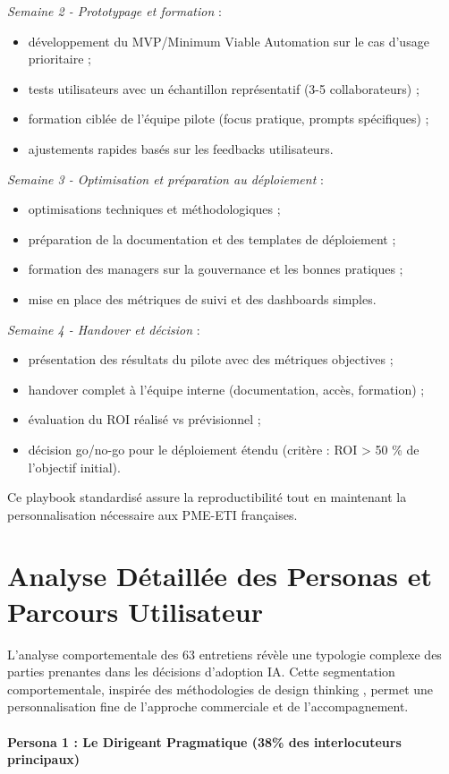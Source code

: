 \textit{Semaine 2 - Prototypage et formation} :
\begin{itemize}
    \item développement du MVP/Minimum Viable Automation sur le cas d'usage prioritaire ;
    \item tests utilisateurs avec un échantillon représentatif (3-5 collaborateurs) ;
    \item formation ciblée de l'équipe pilote (focus pratique, prompts spécifiques) ;
    \item ajustements rapides basés sur les feedbacks utilisateurs.
\end{itemize}

\textit{Semaine 3 - Optimisation et préparation au déploiement} :
\begin{itemize}
    \item optimisations techniques et méthodologiques ;
    \item préparation de la documentation et des templates de déploiement ;
    \item formation des managers sur la gouvernance et les bonnes pratiques ;
    \item mise en place des métriques de suivi et des dashboards simples.
\end{itemize}

\textit{Semaine 4 - Handover et décision} :
\begin{itemize}
    \item présentation des résultats du pilote avec des métriques objectives ;
    \item handover complet à l'équipe interne (documentation, accès, formation) ;
    \item évaluation du ROI réalisé vs prévisionnel ;
    \item décision go/no-go pour le déploiement étendu (critère : ROI > 50 \% de l'objectif initial).
\end{itemize}

Ce playbook standardisé assure la reproductibilité tout en maintenant la personnalisation nécessaire aux PME-ETI françaises.

\section{Analyse Détaillée des Personas et Parcours Utilisateur}

L'analyse comportementale des 63 entretiens révèle une typologie complexe des parties prenantes dans les décisions d'adoption IA. Cette segmentation comportementale, inspirée des méthodologies de design thinking \cite{brown2009change}, permet une personnalisation fine de l'approche commerciale et de l'accompagnement.
\\\\
\textbf{Persona 1 : Le Dirigeant Pragmatique (38\% des interlocuteurs principaux)}

